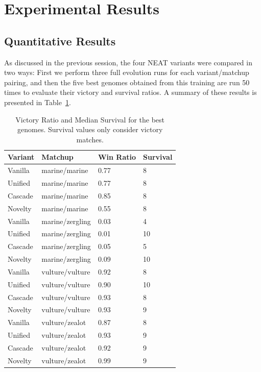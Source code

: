\section{Experimental Results}\label{section:experiments-results}

\subsection{Quantitative Results}\label{subsec:quantitative}

As discussed in the previous session, the four NEAT variants were
compared in two ways: First we perform three full evolution runs for
each variant/matchup pairing, and then the five best genomes obtained
from this training are run 50 times to evaluate their victory and
survival ratios. A summary of these results is presented in
Table~\ref{table:quantitative}.

\begin{table}
    \caption{Victory Ratio and Median Survival for the best genomes.
            Survival values only consider victory matches.}
    \label{table:quantitative}
    \begin{tabular}{llll}
        \toprule
        Variant & Matchup & Win Ratio & Survival \\
        \midrule
        Vanilla & marine/marine & 0.77 & 8 \\
        Unified & marine/marine & 0.77 & 8 \\
        Cascade & marine/marine & 0.85 & 8 \\
        Novelty & marine/marine & 0.55 & 8 \\[1ex]

        Vanilla & marine/zergling & 0.03 & 4 \\
        Unified & marine/zergling & 0.01 & 10 \\
        Cascade & marine/zergling & 0.05 & 5 \\
        Novelty & marine/zergling & 0.09 & 10 \\[1ex]

        Vanilla & vulture/vulture & 0.92 & 8 \\
        Unified & vulture/vulture & 0.90 & 10 \\
        Cascade & vulture/vulture & 0.93 & 8 \\
        Novelty & vulture/vulture & 0.93 & 9 \\[1ex]

        Vanilla & vulture/zealot & 0.87 & 8 \\
        Unified & vulture/zealot & 0.93 & 9 \\
        Cascade & vulture/zealot & 0.92 & 9 \\
        Novelty & vulture/zealot & 0.99 & 9 \\
        \bottomrule
    \end{tabular}
\end{table}

